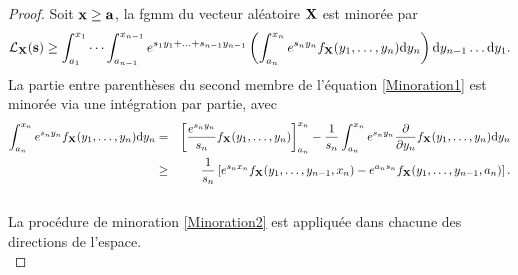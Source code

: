 \begin{proof}
Soit $\bold{x}\geq\bold{a}$, la \gls{fgmm} du vecteur aléatoire $\bold{X}$ est minorée par 
\begin{equation}\label{Minoration1}
\mathcal{L}_{\bold{X}}(\bold{s})\geq\int_{a_{1}}^{x_{1}}\cdots\int_{a_{n-1}}^{x_{n-1}}e^{s_{1}y_{1}+\ldots+s_{n-1}y_{n-1}}\left(\int_{a_{n}}^{x_{n}}e^{s_{n}y_{n}}f_{\bold{X}}(y_{1},\ldots,y_{n})\text{d}y_{n}\right)\text{d}y_{n-1}\ldots\text{d}y_{1}.
\end{equation}
La partie entre parenthèses du second membre de l'équation \eqref{Minoration1} est minorée via une intégration par partie, avec
\begin{eqnarray}
\int_{a_{n}}^{x_{n}}e^{s_{n}y_{n}}f_{\bold{X}}(y_{1},\ldots,y_{n})\text{d}y_{n}&=&\left[\frac{e^{s_{n}y_{n}}}{s_{n}}f_{\bold{X}}(y_{1},\ldots,y_{n})\right]_{a_{n}}^{x_{n}}-\frac{1}{s_{n}}\int_{a_{n}}^{x_{n}}e^{s_{n}y_{n}}\frac{\partial}{\partial y_{n}}f_{\bold{X}}(y_{1},\ldots,y_{n})\text{d}y_{n}\nonumber\\
&\geq&\frac{1}{s_{n}}\left[e^{s_{n}x_{n}}f_{\bold{X}}(y_{1},\ldots,y_{n-1},x_{n})-e^{a_{n}s_{n}}f_{\bold{X}}(y_{1},\ldots,y_{n-1},a_{n})\right].\nonumber\\
&&\label{Minoration2}
\end{eqnarray}
La procédure de minoration \eqref{Minoration2} est appliquée dans chacune des directions de l'espace.\\


\end{proof}
